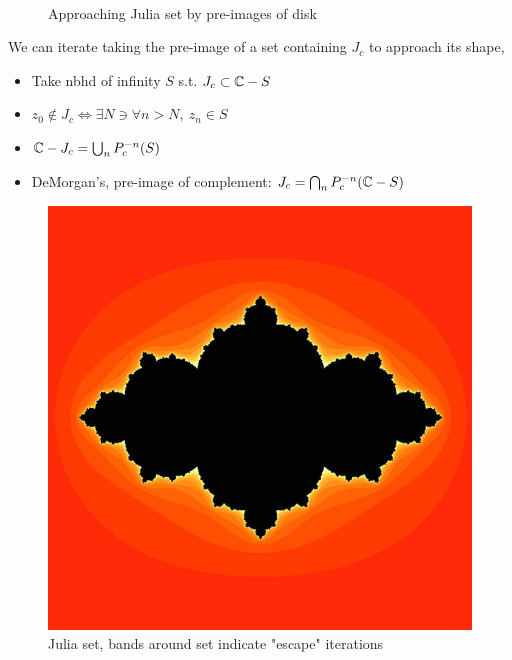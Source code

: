 \documentclass{article}
\begin{document}
\begin{figure}[htbp!]
    \setlength{\abovecaptionskip}{0pt}
    \captionsetup[subfigure]{labelformat=empty}
    \centering
     \\[-3ex]%
    \caption{Approaching Julia set by pre-images of disk \cite{KarlSims}} %
    \label{fig:karlsims_preimage}%
\end{figure}%


We can iterate taking the pre-image of a set containing $J_c$ to approach its shape,
\begin{itemize}
    \item Take nbhd of infinity $S$ s.t. $J_c \subset \mathbb{C} - S$
    \item $z_0 \not \in J_c \iff \exists N \ni \forall n > N,\ z_n \in S$
    \item $\mathbb{C} - J_c = \bigcup_n P_c^{-n}(S)$
    \item DeMorgan's, pre-image of complement: $J_c = \bigcap_n P_c^{-n}(\mathbb{C} - S)$
\end{itemize}


\begin{figure}[h!]
    \centering
    \includegraphics[width=.4\linewidth]{images/600px-Time_escape_Julia_set.jpg}
    \caption{Julia set, bands around set indicate "escape" iterations \cite{JuliaTimeEscape}}
    \label{fig:julia_escape}
\end{figure}
\end{document}
